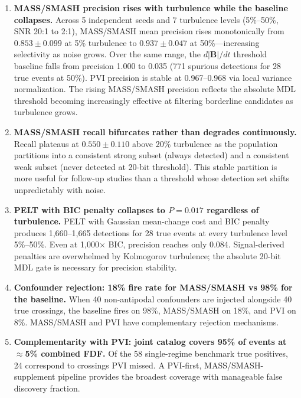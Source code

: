\documentclass[12pt,letterpaper]{article}
\begin{document}
\begin{enumerate}

\item \textbf{MASS/SMASH precision rises with turbulence while the baseline
collapses.}
Across 5 independent seeds and 7 turbulence levels (5\%--50\%, SNR 20:1 to
2:1), MASS/SMASH mean precision rises monotonically from $0.853\pm0.099$ at
5\% turbulence to $0.937\pm0.047$ at 50\%---increasing selectivity as noise
grows.
Over the same range, the $d|\mathbf{B}|/dt$ threshold baseline falls from
precision 1.000 to 0.035 (771 spurious detections for 28 true events at
50\%).
PVI precision is stable at 0.967--0.968 via local variance normalization.
The rising MASS/SMASH precision reflects the absolute MDL threshold becoming
increasingly effective at filtering borderline candidates as turbulence grows.

\item \textbf{MASS/SMASH recall bifurcates rather than degrades continuously.}
Recall plateaus at $0.550\pm0.110$ above 20\% turbulence as the population
partitions into a consistent strong subset (always detected) and a consistent
weak subset (never detected at 20-bit threshold).
This stable partition is more useful for follow-up studies than a threshold
whose detection set shifts unpredictably with noise.

\item \textbf{PELT with BIC penalty collapses to $P = 0.017$ regardless of
turbulence.}
PELT \citep{Killick2012} with Gaussian mean-change cost and BIC penalty
produces 1{,}660--1{,}665 detections for 28 true events at every turbulence
level 5\%--50\%.
Even at 1{,}000$\times$ BIC, precision reaches only 0.084.
Signal-derived penalties are overwhelmed by Kolmogorov turbulence; the
absolute 20-bit MDL gate is necessary for precision stability.

\item \textbf{Confounder rejection: 18\% fire rate for MASS/SMASH vs 98\%
for the baseline.}
When 40 non-antipodal confounders are injected alongside 40 true crossings,
the baseline fires on 98\%, MASS/SMASH on 18\%, and PVI on 8\%.
MASS/SMASH and PVI have complementary rejection mechanisms.

\item \textbf{Complementarity with PVI: joint catalog covers 95\% of events
at $\approx$5\% combined FDF.}
Of the 58 single-regime benchmark true positives, 24 correspond to crossings
PVI missed.
A PVI-first, MASS/SMASH-supplement pipeline provides the broadest coverage
with manageable false discovery fraction.


\end{enumerate}
\end{document}
